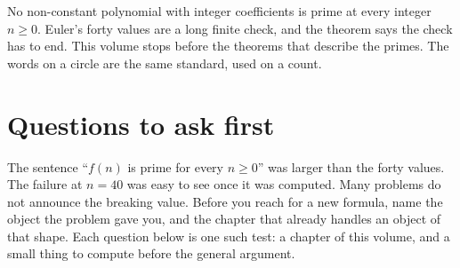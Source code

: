 No non-constant polynomial with integer coefficients is prime at every integer $n\ge0$. Euler's forty values are a long finite check, and the theorem says the check has to end. This volume stops before the theorems that describe the primes. The words on a circle are the same standard, used on a count.

\section*{Questions to ask first}
The sentence ``$f(n)$ is prime for every $n\ge0$'' was larger than the forty values. The failure at $n=40$ was easy to see once it was computed. Many problems do not announce the breaking value. Before you reach for a new formula, name the object the problem gave you, and the chapter that already handles an object of that shape. Each question below is one such test: a chapter of this volume, and a small thing to compute before the general argument.

